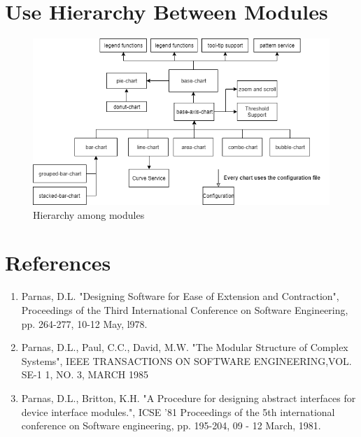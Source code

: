 \documentclass[12pt, titlepage]{article}
\begin{document}
\newpage
\section{Use Hierarchy Between Modules} \label{SecUse}

\begin{figure}[H]
\centering
\includegraphics[width=1\textwidth]{uses-hier.png}
\caption{Hierarchy among modules}
\label{FigUH}
\end{figure}

\newpage
\section{References}
\begin{enumerate}
    \item Parnas, D.L. "Designing Software for Ease of Extension and Contraction", Proceedings of the Third International Conference on Software Engineering, pp. 264-277, 10-12 May, l978.
    \item Parnas, D.L., Paul, C.C., David, M.W. "The Modular Structure of Complex Systems", IEEE TRANSACTIONS ON SOFTWARE ENGINEERING,VOL. SE-1 1, NO. 3, MARCH 1985
    \item  Parnas, D.L., Britton, K.H. "A Procedure for designing abstract interfaces for device interface modules.", ICSE '81 Proceedings of the 5th international conference on Software engineering, pp. 195-204, 09 - 12 March, 1981. 
\end{enumerate}
\end{document}
